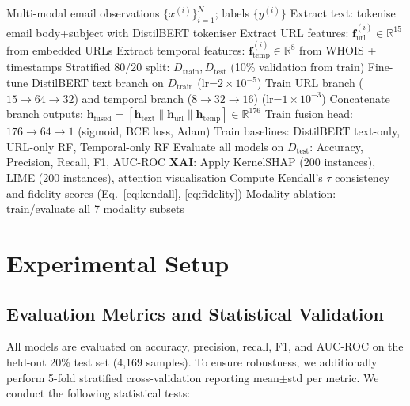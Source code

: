 \documentclass[conference]{IEEEtran}
\begin{document}
\begin{algorithm}[t]
\caption{Late Fusion Multi-Modal Phishing Detection Pipeline}
\label{alg:pipeline}
\begin{algorithmic}[1]
\Require Multi-modal email observations $\{x^{(i)}\}_{i=1}^{N}$; labels $\{y^{(i)}\}$
\State Extract text: tokenise email body+subject with DistilBERT tokeniser
\State Extract URL features: $\mathbf{f}_{\text{url}}^{(i)} \in \mathbb{R}^{15}$ from embedded URLs
\State Extract temporal features: $\mathbf{f}_{\text{temp}}^{(i)} \in \mathbb{R}^{8}$ from WHOIS + timestamps
\State Stratified 80/20 split: $D_{\text{train}}, D_{\text{test}}$ (10\% validation from train)
\State Fine-tune DistilBERT text branch on $D_{\text{train}}$ (lr=$2 \times 10^{-5}$)
\State Train URL branch ($15 \to 64 \to 32$) and temporal branch ($8 \to 32 \to 16$) (lr=$1 \times 10^{-3}$)
\State Concatenate branch outputs: $\mathbf{h}_{\text{fused}} = [\mathbf{h}_{\text{text}} \| \mathbf{h}_{\text{url}} \| \mathbf{h}_{\text{temp}}] \in \mathbb{R}^{176}$
\State Train fusion head: $176 \to 64 \to 1$ (sigmoid, BCE loss, Adam)
\State Train baselines: DistilBERT text-only, URL-only RF, Temporal-only RF
\State Evaluate all models on $D_{\text{test}}$: Accuracy, Precision, Recall, F1, AUC-ROC
\State \textbf{XAI}: Apply KernelSHAP (200 instances), LIME (200 instances), attention visualisation
\State Compute Kendall's $\tau$ consistency and fidelity scores (Eq.~\ref{eq:kendall}, \ref{eq:fidelity})
\State Modality ablation: train/evaluate all 7 modality subsets
\end{algorithmic}
\end{algorithm}

\section{Experimental Setup}
\label{sec:experiments}

\subsection{Evaluation Metrics and Statistical Validation}
\label{subsec:stats}

All models are evaluated on accuracy, precision, recall, F1, and AUC-ROC on
the held-out 20\% test set (4,169 samples). To ensure robustness, we
additionally perform 5-fold stratified cross-validation reporting
mean$\pm$std per metric. We conduct the following statistical tests:
\end{document}
